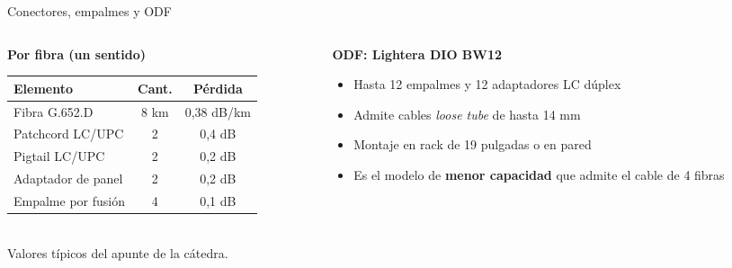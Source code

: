 \begin{frame}{Conectores, empalmes y ODF}
  \begin{columns}[T]
    \begin{column}{0.52\textwidth}
      \textbf{Por fibra (un sentido)}\\[0.1cm]
      \small
      \begin{tabular}{lcc}
        \toprule
        \textbf{Elemento} & \textbf{Cant.} & \textbf{Pérdida} \\
        \midrule
        Fibra G.652.D & 8 km & 0,38 dB/km \\
        Patchcord LC/UPC & 2 & 0,4 dB \\
        Pigtail LC/UPC & 2 & 0,2 dB \\
        Adaptador de panel & 2 & 0,2 dB \\
        Empalme por fusión & 4 & 0,1 dB \\
        \bottomrule
      \end{tabular}\\[0.15cm]
      \normalsize
      \footnotesize Valores típicos del apunte de la cátedra.
    \end{column}
    \begin{column}{0.48\textwidth}
      \textbf{ODF: Lightera DIO BW12}
      \begin{itemize}
        \item Hasta 12 empalmes y 12 adaptadores LC dúplex
        \item Admite cables \emph{loose tube} de hasta 14 mm
        \item Montaje en rack de 19 pulgadas o en pared
        \item Es el modelo de \textbf{menor capacidad} que admite el cable de 4 fibras
      \end{itemize}
    \end{column}
  \end{columns}
\end{frame}

